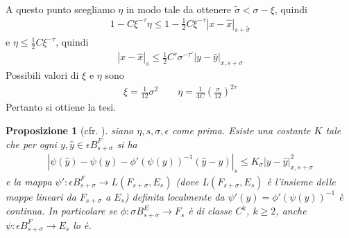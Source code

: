 \documentclass[twoside, 11pt]{amsbook}
\makeatletter
\newcommand{\0}{{(0)}}
\newcommand{\3}{{(3)}}
\theoremstyle{colonplain}
\newtheorem{prop}[thm]{Proposizione}
\theoremstyle{colondefinition}
\theoremstyle{colonremark}
\numberwithin{equation}{chapter}
\renewcommand{\proofname}{Dimostrazione}
\renewenvironment{proof}[1][\proofname]{\par
  \pushQED{\qed}%
  \normalfont \topsep6\p@\@plus6\p@\relax
  \trivlist
  \item[\hskip\labelsep\bfseries #1:]\ignorespaces
}{%
  \popQED\endtrivlist\@endpefalse
}
\makeatother
\begin{document}
\begin{proof}
\begin{align}
\end{align}
A questo punto scegliamo $\eta$ in modo tale da ottenere $\widetilde{\sigma} < \sigma - \xi$, quindi
\begin{align}
    1 - C\xi^{-\tau}\eta \leq 1 - \frac{1}{2}C\xi^{-\tau}|x - \hat{x}|_{s + \widetilde{\sigma}}
\end{align}
e $\eta \leq \frac{1}{2}C\xi^{-\tau}$, quindi
\begin{align}
    |x - \hat{x}|_s \leq \frac{1}{2}C'\sigma^{-\tau'}|y - \hat{y}|_{x, s + \sigma}
\end{align}
Possibili valori di $\xi$ e $\eta$ sono
\begin{align}
    \xi = \frac{1}{12}\sigma^2 \qquad \eta = \frac{1}{4C}\left(\frac{\sigma}{12}\right)^{2\tau}
\end{align}
Pertanto si ottiene la tesi.
\end{proof}
\begin{prop}[cfr. \cite{Massetti}]\label{PsiC^1} siano $\eta, s, \sigma, \epsilon$ come prima. Esiste una costante $K$ tale che per ogni $y, \hat{y} \in \epsilon B^F_{s + \sigma}$ si ha
\begin{align}
    |\psi(\hat{y}) - \psi(y) - \phi'(\psi(y))^{-1}(\hat{y} - y)|_s \leq K_\sigma|y - \hat{y}|^2_{x, s + \sigma}
\end{align}
e la mappa $\psi' : \epsilon B^F_{s + \sigma} \longrightarrow L(F_{s + \sigma}, E_s)$ (dove $L(F_{s + \sigma}, E_s)$ è l'insieme delle mappe lineari da $F_{s + \sigma}$ a $E_s$) definita localmente da $\psi'(y) = \phi'(\psi(y))^{-1}$ è continua. In particolare se $\phi : \sigma B^E_{s + \sigma} \longrightarrow F_s$ è di classe $C^k$, $k \geq 2$, anche $\psi : \epsilon B^F_{s + \sigma} \longrightarrow E_s$ lo è.
\end{prop}
\end{document}
